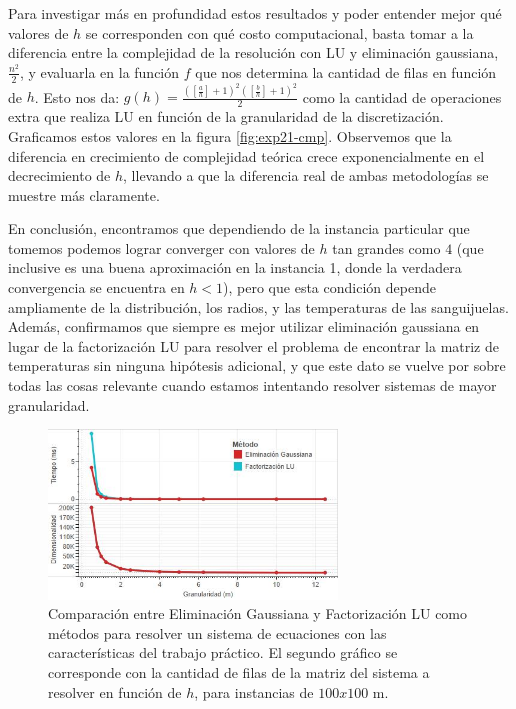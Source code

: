 Para investigar más en profundidad estos resultados y poder entender mejor qué valores de $h$ se corresponden con qué costo computacional, basta tomar a la diferencia entre la complejidad de la resolución con LU y eliminación gaussiana, $\frac{n^2}{2}$, y evaluarla en la función $f$ que nos determina la cantidad de filas en función de $h$. Esto nos da: $g(h) = \frac{([\frac{a}{h}] + 1)^2 ([\frac{b}{h}] + 1)^2}{2}$ como la cantidad de operaciones extra que realiza LU en función de la granularidad de la discretización. Graficamos estos valores en la figura \ref{fig:exp21-cmp}. Observemos que la diferencia en crecimiento de complejidad teórica crece exponencialmente en el decrecimiento de $h$, llevando a que la diferencia real de ambas metodologías se muestre más claramente.

En conclusión, encontramos que dependiendo de la instancia particular que tomemos podemos lograr converger con valores de $h$ tan grandes como $4$ (que inclusive es una buena aproximación en la instancia 1, donde la verdadera convergencia se encuentra en $h < 1$), pero que esta condición depende ampliamente de la distribución, los radios, y las temperaturas de las sanguijuelas. Además, confirmamos que siempre es mejor utilizar eliminación gaussiana en lugar de la factorización LU para resolver el problema de encontrar la matriz de temperaturas sin ninguna hipótesis adicional, y que este dato se vuelve por sobre todas las cosas relevante cuando estamos intentando resolver sistemas de mayor granularidad.

\begin{figure}[h]
    \centering
    \includegraphics[width=0.685\textwidth]{experimento 2-1}
    \caption{Comparación entre Eliminación Gaussiana y Factorización LU como métodos para resolver un sistema de ecuaciones con las características del trabajo práctico. El segundo gráfico se corresponde con la cantidad de filas de la matriz del sistema a resolver en función de $h$, para instancias de $100x100$ m. }
    \label{fig:exp21}
\end{figure}
    
